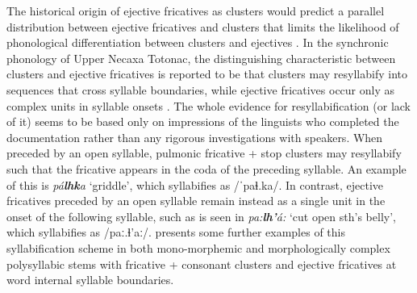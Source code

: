 \documentclass[output=paper,colorlinks,citecolor=brown]{langscibook}
\begin{document}
The historical origin of ejective fricatives as clusters would predict a parallel distribution between ejective fricatives and clusters that limits the likelihood of phonological differentiation between clusters and ejectives \citep{Beck2006}. In the synchronic phonology of Upper Necaxa Totonac, the distinguishing characteristic between clusters and ejective fricatives is reported to be that clusters may resyllabify into sequences that cross syllable boundaries, while ejective fricatives occur only as complex units in syllable onsets \citep{Beck2006}. The whole evidence for resyllabification (or lack of it) seems to be based only on impressions of the linguists who completed the documentation rather than any rigorous investigations with speakers. When preceded by an open syllable, pulmonic fricative + stop clusters may resyllabify such that the fricative appears in the coda of the preceding syllable. An example of this is \textit{p\'a\textbf{lhk}a} `griddle', which syllabifies as {/ˈpa{ɬ}.ka/}. In contrast, ejective fricatives preceded by an open syllable remain instead as a single unit in the onset of the following syllable, such as is seen in \textit{pa:\textbf{lh’}á:} `cut open sth's belly', which syllabifies as {/paː.{ɬ}'aː/}.  presents some further examples of this syllabification scheme in both mono-morphemic and morphologically complex polysyllabic stems with fricative + consonant clusters and ejective fricatives at word internal syllable boundaries.
\end{document}
